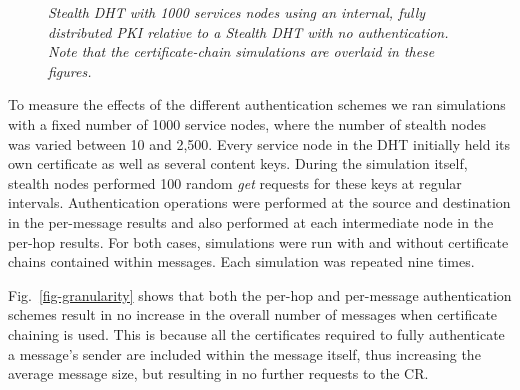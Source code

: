 \documentclass{elsart3p}
\begin{document}
\begin{figure}[tb]
\center {}
\caption{\em Stealth DHT with 1000 services nodes using an internal,
fully distributed PKI relative to a Stealth DHT with no
authentication. Note that the certificate-chain simulations are
overlaid in these figures.} \label{fig-granularities}
\end{figure}

To measure the effects of the different authentication schemes we
ran simulations
with a fixed number of 1000 service nodes, where the number of
stealth nodes was varied between 10 and 2,500. Every service node in
the DHT initially held its own certificate as well as several
content keys. During the simulation itself, stealth nodes performed
100 random \emph{get} requests for these keys at regular intervals.
Authentication operations were performed at the
source and destination in the per-message results and also performed
at each intermediate node in the per-hop results. For both cases,
simulations were run with and without certificate chains contained
within messages. Each simulation was repeated nine times.

Fig.~\ref{fig-granularity} shows that both the per-hop and
per-message authentication schemes result in no increase in the
overall number of messages when certificate chaining is used. This
is because all the certificates required to fully authenticate a
message's sender are included within the message itself, thus
increasing the average message size, but resulting in no further
requests to the CR.
\end{document}
